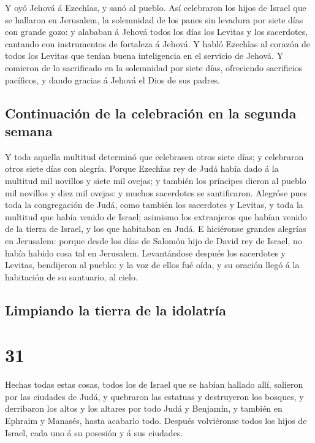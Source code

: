  Y oyó Jehová á Ezechîas, y sanó al pueblo. 
Así celebraron los hijos de Israel que se hallaron en Jerusalem, la
solemnidad de los panes sin levadura por siete días con grande gozo: y
alababan á Jehová todos los días los Levitas y los sacerdotes, cantando
con instrumentos de fortaleza á Jehová.  Y habló Ezechîas
al corazón de todos los Levitas que tenían buena inteligencia en el
servicio de Jehová. Y comieron de lo sacrificado en la solemnidad por
siete días, ofreciendo sacrificios pacíficos, y dando gracias á Jehová
el Dios de sus padres.

\hypertarget{continuaciuxf3n-de-la-celebraciuxf3n-en-la-segunda-semana}{%
\subsection{Continuación de la celebración en la segunda
semana}\label{continuaciuxf3n-de-la-celebraciuxf3n-en-la-segunda-semana}}

 Y toda aquella multitud determinó que celebrasen otros
siete días; y celebraron otros siete días con alegría. 
Porque Ezechîas rey de Judá había dado á la multitud mil novillos y
siete mil ovejas; y también los príncipes dieron al pueblo mil novillos
y diez mil ovejas: y muchos sacerdotes se santificaron. 
Alegróse pues toda la congregación de Judá, como también los sacerdotes
y Levitas, y toda la multitud que había venido de Israel; asimismo los
extranjeros que habían venido de la tierra de Israel, y los que
habitaban en Judá.  E hiciéronse grandes alegrías en
Jerusalem: porque desde los días de Salomón hijo de David rey de Israel,
no había habido cosa tal en Jerusalem.  Levantándose
después los sacerdotes y Levitas, bendijeron al pueblo: y la voz de
ellos fué oída, y su oración llegó á la habitación de su santuario, al
cielo.

\hypertarget{limpiando-la-tierra-de-la-idolatruxeda}{%
\subsection{Limpiando la tierra de la
idolatría}\label{limpiando-la-tierra-de-la-idolatruxeda}}

\hypertarget{section-30}{%
\section{31}\label{section-30}}

 Hechas todas estas cosas, todos los de Israel que se habían
hallado allí, salieron por las ciudades de Judá, y quebraron las
estatuas y destruyeron los bosques, y derribaron los altos y los altares
por todo Judá y Benjamín, y también en Ephraim y Manasés, hasta acabarlo
todo. Después volviéronse todos los hijos de Israel, cada uno á su
posesión y á sus ciudades.

